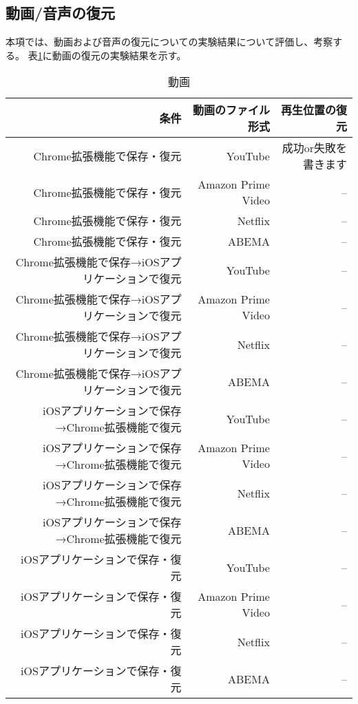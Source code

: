 \subsection{動画/音声の復元}
本項では、動画および音声の復元についての実験結果について評価し、考察する。
表\ref{tb:evl-result-video}に動画の復元の実験結果を示す。

\begin{table}[htbp]
  \caption{動画}
  \label{tb:evl-result-video}
  \begin{center}
    \begin{tabular}{rrr}
      \hline
      条件 & 動画のファイル形式 & 再生位置の復元 \\ \hline \hline
      Chrome拡張機能で保存・復元 & YouTube & 成功or失敗を書きます  \\ \hline
      Chrome拡張機能で保存・復元 & Amazon Prime Video & --  \\ \hline
      Chrome拡張機能で保存・復元 & Netflix & --  \\ \hline
      Chrome拡張機能で保存・復元 & ABEMA & --  \\ \hline
      Chrome拡張機能で保存→iOSアプリケーションで復元 & YouTube & --  \\ \hline
      Chrome拡張機能で保存→iOSアプリケーションで復元 & Amazon Prime Video & --  \\ \hline
      Chrome拡張機能で保存→iOSアプリケーションで復元 & Netflix & --  \\ \hline
      Chrome拡張機能で保存→iOSアプリケーションで復元 & ABEMA & --  \\ \hline
      iOSアプリケーションで保存→Chrome拡張機能で復元 & YouTube & --  \\ \hline
      iOSアプリケーションで保存→Chrome拡張機能で復元 & Amazon Prime Video & --  \\ \hline
      iOSアプリケーションで保存→Chrome拡張機能で復元 & Netflix & --  \\ \hline
      iOSアプリケーションで保存→Chrome拡張機能で復元 & ABEMA & --  \\ \hline
      iOSアプリケーションで保存・復元 & YouTube & --  \\ \hline
      iOSアプリケーションで保存・復元 & Amazon Prime Video & --  \\ \hline
      iOSアプリケーションで保存・復元 & Netflix & --  \\ \hline
      iOSアプリケーションで保存・復元 & ABEMA & --  \\ \hline
    \end{tabular}
  \end{center}
\end{table}

